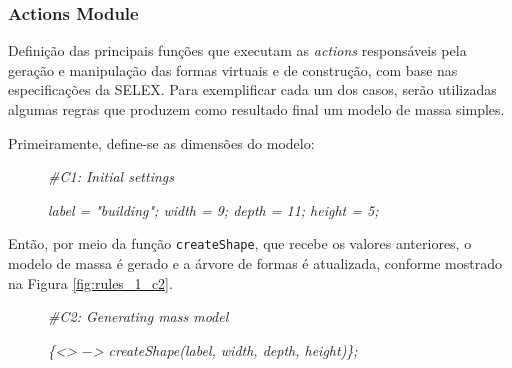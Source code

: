\subsubsection{Actions Module}
\label{sec:actions}

Definição das principais funções que executam as \textit{actions} responsáveis pela geração e manipulação das formas virtuais e de construção, com base nas especificações da \gls{SELEX}. Para exemplificar cada um dos casos, serão utilizadas algumas regras que produzem como resultado final um modelo de massa simples.

Primeiramente, define-se as dimensões do modelo:

\vspace{0.3cm}

\begin{description}
    \item[] \qquad \textit{\#C1: Initial settings}
    \item[] \qquad \textit{label = "building"; width = 9; depth = 11; height = 5;}
\end{description}

\vspace{0.3cm}

Então, por meio da função \texttt{createShape}, que recebe os valores anteriores, o modelo de massa é gerado e a árvore de formas é atualizada, conforme mostrado na Figura \ref{fig:rules_1_c2}.

\vspace{0.3cm}

\begin{description}
    \item[] \qquad \textit{\#C2: Generating mass model}
    \item[] \qquad \textit{\{<> $-$> createShape(label, width, depth, height)\};}
\end{description}

\vspace{0.3cm}

\begin{figure}[h!]
	\centering
	\captionsetup{width=15cm}
	{}	
\end{figure}

